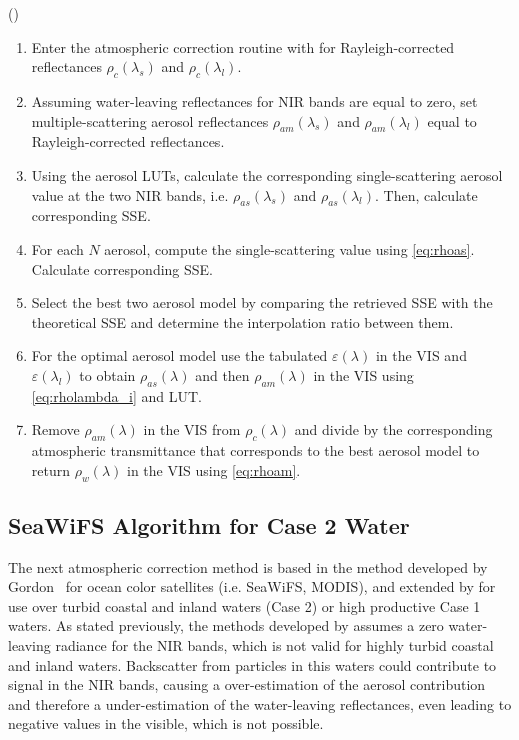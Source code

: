 (\cite{Ruddick:2000bs})
\begin{enumerate}[itemsep=2pt,parsep=2pt]
  \item Enter the atmospheric correction routine with for Rayleigh-corrected reflectances $\rho_c(\lambda_s)$ and $\rho_c(\lambda_l)$.
  \item Assuming water-leaving reflectances for NIR bands are equal to zero, set multiple-scattering aerosol reflectances $\rho_{am}(\lambda_s)$ and $\rho_{am}(\lambda_l)$ equal to Rayleigh-corrected reflectances.
  \item Using the aerosol LUTs, calculate the corresponding single-scattering aerosol value at the two NIR bands, i.e. $\rho_{as}(\lambda_s)$ and $\rho_{as}(\lambda_l)$. Then, calculate corresponding SSE.
  \item For each $N$ aerosol, compute the single-scattering value using \autoref{eq:rhoas}. Calculate corresponding SSE.
  \item Select the best two aerosol model by comparing the retrieved SSE with the theoretical SSE and determine the interpolation ratio between them.
  \item For the optimal aerosol model use the tabulated $\varepsilon(\lambda)$ in the VIS and $\varepsilon(\lambda_l)$ to obtain $\rho_{as}(\lambda)$ and then $\rho_{am}(\lambda)$ in the VIS using \autoref{eq:rholambda_i} and LUT.
  \item Remove $\rho_{am}(\lambda)$ in the VIS from $\rho_c(\lambda)$ and divide by the corresponding atmospheric transmittance that corresponds to the best aerosol model to return $\rho_w(\lambda)$ in the VIS using \autoref{eq:rhoam}.
\end{enumerate}

\subsection{SeaWiFS Algorithm for Case 2 Water}

The next atmospheric correction method is based in the method developed by Gordon~\cite{Gordon:1997} for ocean color satellites (i.e. SeaWiFS, MODIS), and extended by \cite{Ruddick:2000bs} for use over turbid coastal and inland waters (Case 2) or high productive Case 1 waters. As stated previously, the methods developed by \cite{Gordon:1994} assumes a zero water-leaving radiance for the NIR bands, which is not valid for highly turbid coastal and inland waters. Backscatter from particles in this waters could contribute to signal in the NIR bands, causing a over-estimation of the aerosol contribution and therefore a under-estimation of the water-leaving reflectances, even leading to negative values in the visible, which is not possible. 

